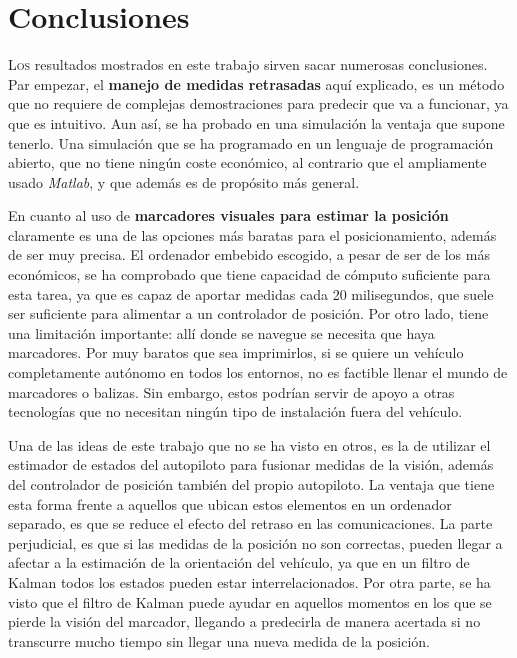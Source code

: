 \chapter{Conclusiones} \label{chp-conclusiones}



\lettrine[lraise=-0.1, lines=2, loversize=0.2]{L}{os} resultados mostrados en este trabajo sirven sacar numerosas conclusiones. Par empezar, el \textbf{manejo de medidas retrasadas} aquí explicado, es un método que no requiere de complejas demostraciones para predecir que va a funcionar, ya que es intuitivo. Aun así, se ha probado en una simulación la ventaja que supone tenerlo. Una simulación que se ha programado en un lenguaje de programación abierto, que no tiene ningún coste económico, al contrario que el ampliamente usado \textit{Matlab}, y que además es de propósito más general. 



En cuanto al uso de \textbf{marcadores visuales para estimar la posición} claramente es una de las opciones más baratas para el posicionamiento, además de ser muy precisa. El ordenador embebido escogido, a pesar de ser de los más económicos, se ha comprobado que tiene capacidad de cómputo suficiente para esta tarea, ya que es capaz de aportar medidas cada 20 milisegundos, que suele ser suficiente para alimentar a un controlador de posición.
Por otro lado, tiene una limitación importante: allí donde se navegue se necesita que haya marcadores. Por muy baratos que sea imprimirlos, si se quiere un vehículo completamente autónomo en todos los entornos, no es factible llenar el mundo de marcadores o balizas.  
Sin embargo, estos podrían servir de apoyo a otras tecnologías que no necesitan ningún tipo de instalación fuera del vehículo. 

Una de las ideas de este trabajo que no se ha visto en otros, es la de utilizar el estimador de estados del autopiloto para fusionar medidas de la visión, además del controlador de posición también del propio autopiloto. La ventaja que tiene esta forma frente a aquellos que ubican estos elementos en un ordenador separado, es que se reduce el efecto del retraso en las comunicaciones. 
La parte perjudicial, es que si las medidas de la posición no son correctas, pueden llegar a afectar a la estimación de la orientación del vehículo, ya que en un filtro de Kalman todos los estados pueden estar interrelacionados. Por otra parte, se ha visto que el filtro de Kalman puede ayudar en aquellos momentos en los que se pierde la visión del marcador, llegando a predecirla de manera acertada si no transcurre mucho tiempo sin llegar una nueva medida de la posición. 


